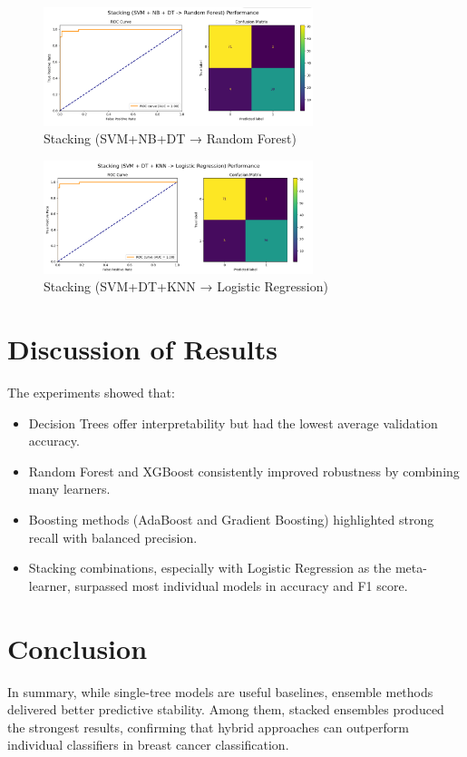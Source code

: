 \documentclass[12pt,a4paper]{article}
\begin{document}
\begin{figure}[h!]
    \centering
    \includegraphics[width=0.7\textwidth]{8.png}
    \caption{Stacking (SVM+NB+DT → Random Forest)}
\end{figure}

\begin{figure}[h!]
    \centering
    \includegraphics[width=0.7\textwidth]{9.png}
    \caption{Stacking (SVM+DT+KNN → Logistic Regression)}
\end{figure}



\section*{Discussion of Results}
The experiments showed that:
\begin{itemize}
    \item Decision Trees offer interpretability but had the lowest average validation accuracy.
    \item Random Forest and XGBoost consistently improved robustness by combining many learners.
    \item Boosting methods (AdaBoost and Gradient Boosting) highlighted strong recall with balanced precision.
    \item Stacking combinations, especially with Logistic Regression as the meta-learner, surpassed most individual models in accuracy and F1 score.
\end{itemize}

\section*{Conclusion}
In summary, while single-tree models are useful baselines, ensemble methods delivered better predictive stability. Among them, stacked ensembles produced the strongest results, confirming that hybrid approaches can outperform individual classifiers in breast cancer classification.
\end{document}
